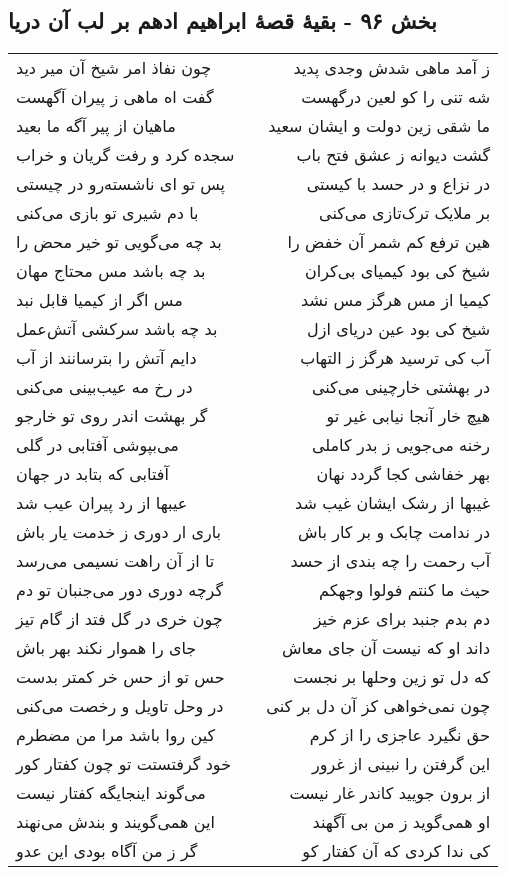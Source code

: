 \begin{center}
\section*{بخش ۹۶ - بقیهٔ قصهٔ ابراهیم ادهم بر لب آن دریا}
\label{sec:sh096}
\begin{longtable}{l p{0.5cm} r}
چون نفاذ امر شیخ آن میر دید
&&
ز آمد ماهی شدش وجدی پدید
\\
گفت اه ماهی ز پیران آگهست
&&
شه تنی را کو لعین درگهست
\\
ماهیان از پیر آگه ما بعید
&&
ما شقی زین دولت و ایشان سعید
\\
سجده کرد و رفت گریان و خراب
&&
گشت دیوانه ز عشق فتح باب
\\
پس تو ای ناشسته‌رو در چیستی
&&
در نزاع و در حسد با کیستی
\\
با دم شیری تو بازی می‌کنی
&&
بر ملایک ترک‌تازی می‌کنی
\\
بد چه می‌گویی تو خیر محض را
&&
هین ترفع کم شمر آن خفض را
\\
بد چه باشد مس محتاج مهان
&&
شیخ کی بود کیمیای بی‌کران
\\
مس اگر از کیمیا قابل نبد
&&
کیمیا از مس هرگز مس نشد
\\
بد چه باشد سرکشی آتش‌عمل
&&
شیخ کی بود عین دریای ازل
\\
دایم آتش را بترسانند از آب
&&
آب کی ترسید هرگز ز التهاب
\\
در رخ مه عیب‌بینی می‌کنی
&&
در بهشتی خارچینی می‌کنی
\\
گر بهشت اندر روی تو خارجو
&&
هیچ خار آنجا نیابی غیر تو
\\
می‌بپوشی آفتابی در گلی
&&
رخنه می‌جویی ز بدر کاملی
\\
آفتابی که بتابد در جهان
&&
بهر خفاشی کجا گردد نهان
\\
عیبها از رد پیران عیب شد
&&
غیبها از رشک ایشان غیب شد
\\
باری ار دوری ز خدمت یار باش
&&
در ندامت چابک و بر کار باش
\\
تا از آن راهت نسیمی می‌رسد
&&
آب رحمت را چه بندی از حسد
\\
گرچه دوری دور می‌جنبان تو دم
&&
حیث ما کنتم فولوا وجهکم
\\
چون خری در گل فتد از گام تیز
&&
دم بدم جنبد برای عزم خیز
\\
جای را هموار نکند بهر باش
&&
داند او که نیست آن جای معاش
\\
حس تو از حس خر کمتر بدست
&&
که دل تو زین وحلها بر نجست
\\
در وحل تاویل و رخصت می‌کنی
&&
چون نمی‌خواهی کز آن دل بر کنی
\\
کین روا باشد مرا من مضطرم
&&
حق نگیرد عاجزی را از کرم
\\
خود گرفتستت تو چون کفتار کور
&&
این گرفتن را نبینی از غرور
\\
می‌گوند اینجایگه کفتار نیست
&&
از برون جویید کاندر غار نیست
\\
این همی‌گویند و بندش می‌نهند
&&
او همی‌گوید ز من بی آگهند
\\
گر ز من آگاه بودی این عدو
&&
کی ندا کردی که آن کفتار کو
\\
\end{longtable}
\end{center}
